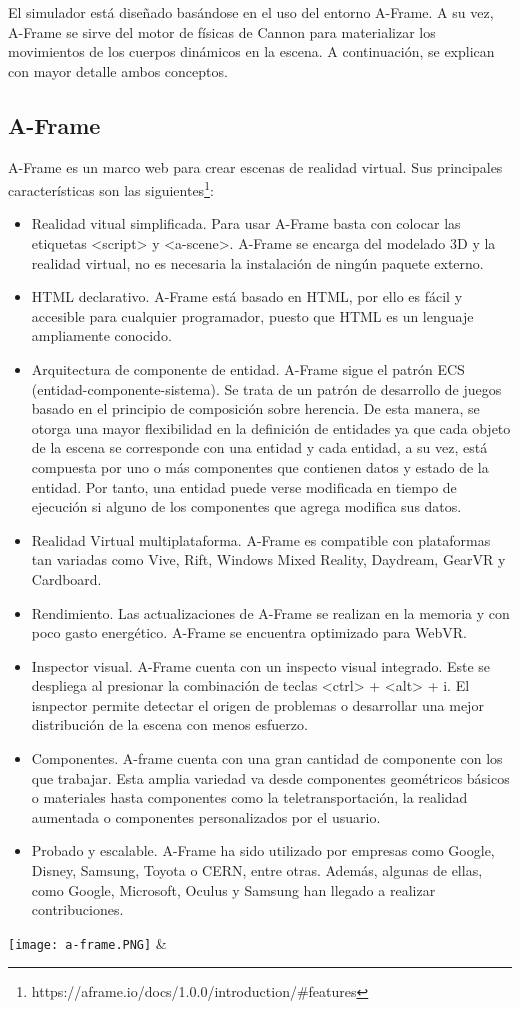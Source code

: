 El simulador está diseñado basándose en el uso del entorno A-Frame. A su vez, A-Frame se sirve del motor de físicas de Cannon para materializar los movimientos de los cuerpos dinámicos en la escena. A continuación, se explican con mayor detalle ambos conceptos.

\subsection{A-Frame}
A-Frame es un marco web para crear escenas de realidad virtual. Sus principales características son las siguientes\footnote{https://aframe.io/docs/1.0.0/introduction/#features}:

\begin{itemize}
    \item Realidad vitual simplificada. Para usar A-Frame basta con colocar las etiquetas <script> y <a-scene>. A-Frame se encarga del modelado 3D y la realidad virtual, no es necesaria la instalación de ningún paquete externo.
    \item HTML declarativo. A-Frame está basado en HTML, por ello es fácil y accesible para cualquier programador, puesto que HTML es un lenguaje ampliamente conocido.
    \item Arquitectura de componente de entidad. A-Frame sigue el patrón ECS (entidad-componente-sistema). Se trata de un patrón de desarrollo de juegos basado en el principio de composición sobre herencia. De esta manera, se otorga una mayor flexibilidad en la definición de entidades ya que cada objeto de la escena se corresponde con una entidad y cada entidad, a su vez, está compuesta por uno o más componentes que contienen datos y estado de la entidad. Por tanto, una entidad puede verse modificada en tiempo de ejecución si alguno de los componentes que agrega modifica sus datos.
    \item Realidad Virtual multiplataforma. A-Frame es compatible con plataformas tan variadas como Vive, Rift, Windows Mixed Reality, Daydream, GearVR y Cardboard.
    \item Rendimiento. Las actualizaciones de A-Frame se realizan en la memoria y con poco gasto energético. A-Frame se encuentra optimizado para WebVR.
    \item Inspector visual. A-Frame cuenta con un inspecto visual integrado. Este se despliega al presionar la combinación de teclas <ctrl> + <alt> + i. El isnpector permite detectar el origen de problemas o desarrollar una mejor distribución de la escena con menos esfuerzo.
    \item Componentes. A-frame cuenta con una gran cantidad de componente con los que trabajar. Esta amplia variedad va desde componentes geométricos básicos o materiales hasta componentes como la teletransportación, la realidad aumentada o componentes personalizados por el usuario.
    \item Probado y escalable. A-Frame ha sido utilizado por empresas como Google, Disney, Samsung, Toyota o CERN, entre otras. Además, algunas de ellas, como Google, Microsoft, Oculus y Samsung han llegado a realizar contribuciones.
\end{itemize}
\texttt{[image: a-frame.PNG]} & \newline

